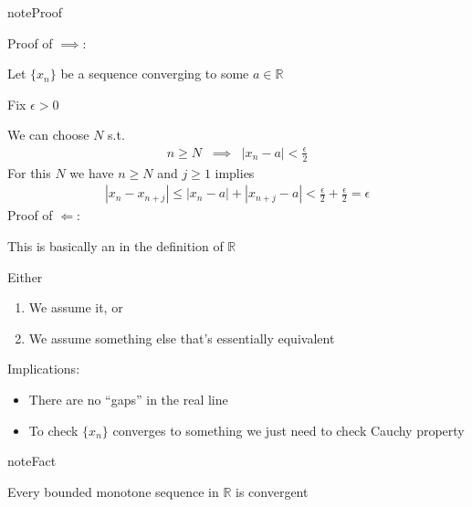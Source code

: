 \documentclass[letterpaper,10pt,english]{jupyterBook}
\begin{document}
\begin{sphinxadmonition}{note}{Proof}

\sphinxAtStartPar
Proof of \(\implies\):

\sphinxAtStartPar
Let \(\{x_n\}\) be a sequence converging to some \(a \in \mathbb{R}\)

\sphinxAtStartPar
Fix \(\epsilon > 0\)

\sphinxAtStartPar
We can choose \(N\) s.t.
\begin{equation*}
\begin{split}
n \geq N \;\; \implies \;\; |x_n - a | < \frac{\epsilon}{2} 
\end{split}
\end{equation*}
\sphinxAtStartPar
For this \(N\) we have \(n \geq N\) and \(j \geq 1\) implies
\begin{equation*}
\begin{split}
|x_n - x_{n+j}|
\leq |x_n - a| + |x_{n+j} - a|
< \frac{\epsilon}{2} + \frac{\epsilon}{2} = \epsilon
\end{split}
\end{equation*}
\sphinxAtStartPar
Proof of \(\Leftarrow\):

\sphinxAtStartPar
This is basically an  in the definition of \(\mathbb{R}\)

\sphinxAtStartPar
Either
\begin{enumerate}
%
\item {} 
\sphinxAtStartPar
We assume it, or

\item {} 
\sphinxAtStartPar
We assume something else that’s essentially equivalent

\end{enumerate}
\end{sphinxadmonition}

\sphinxAtStartPar
Implications:
\begin{itemize}
\item {} 
\sphinxAtStartPar
There are no “gaps” in the real line

\item {} 
\sphinxAtStartPar
To check \(\{x_n\}\) converges to something we just need to check Cauchy property

\end{itemize}

\begin{sphinxadmonition}{note}{Fact}

\sphinxAtStartPar
Every bounded monotone sequence in \(\mathbb{R}\) is convergent
\end{sphinxadmonition}
\end{document}
